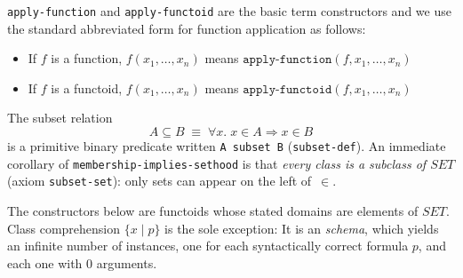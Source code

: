 \documentclass{amsbook}[openany]
\theoremstyle{definition}
\theoremstyle{remark}
\theoremstyle{remark}
\begin{document}
\texttt{apply-function} and \texttt{apply-functoid} are the basic term
constructors and we use the standard abbreviated form for function
application as follows:
%
\begin{itemize}[label=$\cdot$, leftmargin=1cm]
%
\item If $f$ is a function, $f(x_1, \ldots, x_n)$ means $\texttt{apply-function}(f,x_1, \ldots, x_n)$

%

\item If $f$ is a functoid, $f(x_1, \ldots, x_n)$ means
$\texttt{apply-functoid}(f,x_1, \ldots, x_n)$
%
\end{itemize}



%

%

%
The subset relation
\[
  A \subseteq B \;\equiv\; \forall x.\; x \in A \Rightarrow x \in B
\]
is a primitive binary predicate written \texttt{A subset B}
(\texttt{subset-def}).  An immediate corollary of
\texttt{membership-implies-sethood} is that \emph{every class is a
subclass of $\mathit{SET}$} (axiom \texttt{subset-set}): only sets can
appear on the left of~$\in$.

The constructors below are functoids whose stated domains are elements
of $\mathit{SET}$.  Class comprehension $\{x \mid p\}$ is the sole
exception: It is an \emph{schema}, which yields an infinite number of
instances, one for each syntactically correct formula $p$, and each
one with $0$ arguments.
\end{document}
